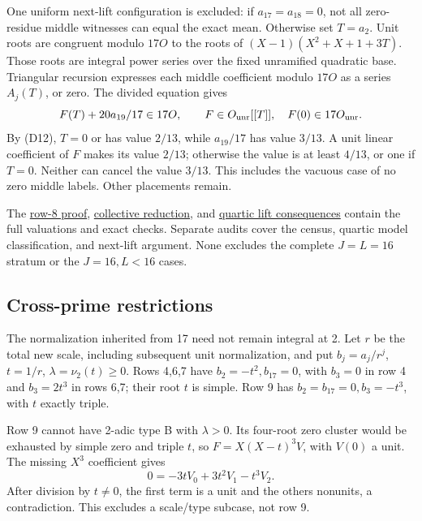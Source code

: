 \documentclass[
  british,
  10pt,
]{article}
\begin{document}
One uniform next-lift configuration is excluded: if \(a_{17}=a_{18}=0\),
not all zero-residue middle witnesses can equal the exact mean.
Otherwise set \(T=a_2\). Unit roots are congruent modulo \(17O\) to the
roots of \((X-1)(X^2+X+1+3T)\). Those roots are integral power series
over the fixed unramified quadratic base. Triangular recursion expresses
each middle coefficient modulo \(17O\) as a series \(A_j(T)\), or zero.
The divided equation gives \[
 F(T)+20a_{19}/17\in17O,\qquad
 F\in O_{\rm unr}[[T]],\quad F(0)\in17O_{\rm unr}.
\] By (D12), \(T=0\) or has value \(2/13\), while \(a_{19}/17\) has
value \(3/13\). A unit linear coefficient of \(F\) makes its value
\(2/13\); otherwise the value is at least \(4/13\), or one if \(T=0\).
Neither can cancel the value \(3/13\). This includes the vacuous case of
no zero middle labels. Other placements remain.

The \href{evidence/full/wild17/ROW8_BOUND_AND_DIVIDED_IDENTITY.md}{row-8
proof},
\href{evidence/full/wild17/blowup/COLLECTIVE_REDUCTION.md}{collective
reduction}, and
\href{evidence/full/wild17/blowup/m4/LIFT_CONSEQUENCES.md}{quartic lift
consequences} contain the full valuations and exact checks. Separate
audits cover the census, quartic model classification, and next-lift
argument. None excludes the complete \(J=L=16\) stratum or the
\(J=16,L<16\) cases.

\subsection{Cross-prime restrictions}\label{cross-prime-restrictions}

The normalization inherited from 17 need not remain integral at 2. Let
\(r\) be the total new scale, including subsequent unit normalization,
and put \(b_j=a_j/r^j\), \(t=1/r\), \(\lambda=\nu_2(t)\ge0\). Rows 4,6,7
have \(b_2=-t^2,b_{17}=0\), with \(b_3=0\) in row 4 and \(b_3=2t^3\) in
rows 6,7; their root \(t\) is simple. Row 9 has
\(b_2=b_{17}=0,b_3=-t^3\), with \(t\) exactly triple.

Row 9 cannot have 2-adic type B with \(\lambda>0\). Its four-root zero
cluster would be exhausted by simple zero and triple \(t\), so
\(F=X(X-t)^3V\), with \(V(0)\) a unit. The missing \(X^3\) coefficient
gives \[
 0=-3tV_0+3t^2V_1-t^3V_2.
\] After division by \(t\ne0\), the first term is a unit and the others
nonunits, a contradiction. This excludes a scale/type subcase, not row
9.
\end{document}

